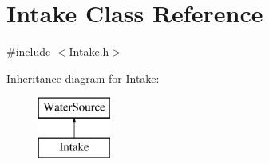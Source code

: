 \hypertarget{classIntake}{}\section{Intake Class Reference}
\label{classIntake}


{\ttfamily \#include $<$Intake.\+h$>$}

Inheritance diagram for Intake\+:\begin{figure}[H]
\begin{center}
\leavevmode
\includegraphics[height=2.000000cm]{classIntake}
\end{center}
\end{figure}

